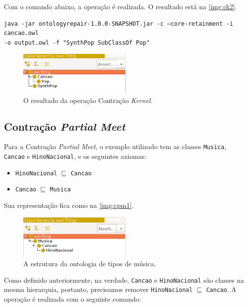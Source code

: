 Com o comando abaixo, a operação é realizada. O resultado está na \autoref{img:ck2}.

\begin{small}
	\texttt{java -jar ontologyrepair-1.0.0-SNAPSHOT.jar -c --core-retainment -i cancao.owl \\ -o output.owl -f "SynthPop SubClassOf Pop"}
\end{small}

\begin{figure}[H]
	\centering
	\includegraphics[width=0.5\textwidth]{Capitulos/Implementacao/ck2.png}
	\caption{O resultado da operação Contração \textit{Kernel}.}
	\label{img:ck2}
\end{figure}


\subsection{Contração \textit{Partial Meet}}

Para a Contração \textit{Partial Meet}, o exemplo utilizado tem as classes \texttt{Musica}, \texttt{Cancao} e \texttt{HinoNacional}, e os seguintes axiomas: 

\begin{itemize}
	\item \texttt{HinoNacional} $ \sqsubseteq $ \texttt{Cancao}
	\item \texttt{Cancao} $ \sqsubseteq $ \texttt{Musica}
\end{itemize}

Sua representação fica como na \autoref{img:cpm1}.

\begin{figure}[H]
	\centering
	\includegraphics[width=0.5\textwidth]{Capitulos/Implementacao/cpm1.png}
	\caption{A estrutura da ontologia de tipos de música.}
	\label{img:cpm1}
\end{figure}

Como definido anteriormente, na verdade, \texttt{Cancao} e \texttt{HinoNacional} são classes na mesma hierarquia, portanto, precisamos remover \texttt{HinoNacional} $ \sqsubseteq $ \texttt{Cancao}. A operação é realizada com o seguinte comando:

